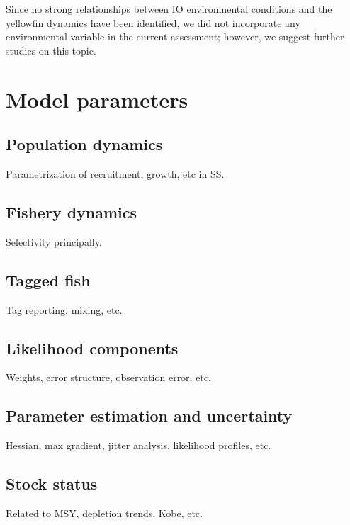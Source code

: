 \documentclass[
]{scrartcl}
\begin{document}
Since no strong relationships between IO environmental conditions and
the yellowfin dynamics have been identified, we did not incorporate any
environmental variable in the current assessment; however, we suggest
further studies on this topic.

\section{Model parameters}\label{model-parameters}

\subsection{Population dynamics}\label{population-dynamics}

Parametrization of recruitment, growth, etc in SS.

\subsection{Fishery dynamics}\label{fishery-dynamics}

Selectivity principally.

\subsection{Tagged fish}\label{tagged-fish}

Tag reporting, mixing, etc.

\subsection{Likelihood components}\label{likelihood-components}

Weights, error structure, observation error, etc.

\subsection{Parameter estimation and
uncertainty}\label{parameter-estimation-and-uncertainty}

Hessian, max gradient, jitter analysis, likelihood profiles, etc.

\subsection{Stock status}\label{stock-status}

Related to MSY, depletion trends, Kobe, etc.
\end{document}
